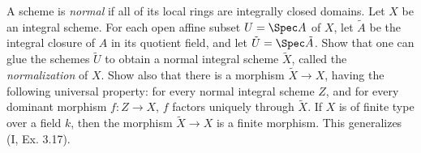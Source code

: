 \begin{exercise}[Normalization.] %
	A scheme is \textit{normal} if all of its local rings are integrally closed domains. Let $X$ be an integral scheme. For each open affine subset $U = \Spec A$ of $X$, let $\tilde{A} $ be the integral closure of $A$ in its quotient field, and let $\tilde{U} = \Spec \tilde{A}$. Show that one can glue the schemes $\tilde{U}$ to obtain a normal integral scheme $\tilde{X} $, called the \textit{normalization} of $X$. Show also that there is a morphism $\tilde{X} \to X$, having the following universal property: for every normal integral scheme $Z$, and for every dominant morphism $f:Z \to X$, $f $ factors uniquely through $\tilde{X}$. If $X$ is of finite type over a field $k$, then the morphism $\tilde{X} \to X$ is a finite morphism. This generalizes (I, Ex. 3.17).
\end{exercise}
